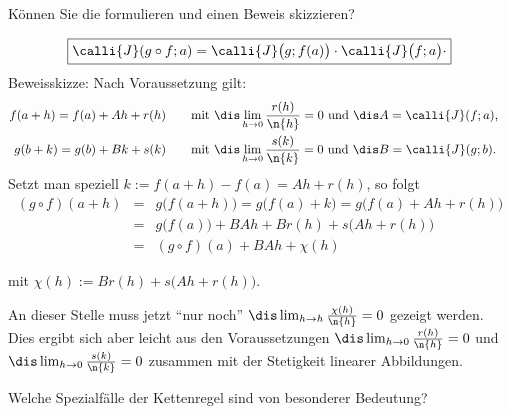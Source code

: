 \begin{frage}
  Können Sie die  formulieren und einen Beweis skizzieren?
\end{frage}

\begin{antwort}
  \[
  \boxed{ 
    \calli{J} ( g\circ f; a) = 
    \calli{J} \big(g;f(a)\big)\cdot
    \calli{J} \big(f;a\big)\cdot
  }
  \]
  \medskip\noindent
  Beweisskizze: Nach Voraussetzung gilt:
  \begin{align*}
    f(a+h)=f(a)+Ah + r(h) &
    \qquad\text{mit $\dis\lim_{h\to 0} \frac{r(h)}{\n{h}}=0$ 
      und $\dis A= \calli{J}(f;a)$,}& \\
    g(b+k)=g(b)+Bk + s(k) &\qquad\text{mit 
      $\dis\lim_{h\to 0} \frac{s(k)}{\n{k}}=0$ 
      und $\dis B= \calli{J}(g;b)$.}&
  \end{align*}
  Setzt man speziell $k := f(a+h)-f(a)=Ah+r(h)$, so folgt 
  \begin{eqnarray*}
    (g\circ f)(a+h) &=& g \big( f(a+h) \big) = g \big( f(a)+k \big) 
    = g \big( f(a)+ Ah + r(h) \big)
    \\
    &=& g \big( f(a) \big) + BAh + Br(h) + s\big( Ah + r(h) \big) \\
    &=& (g\circ f) (a) + BAh + \chi( h ) 
  \end{eqnarray*}

  \medskip\noindent
  mit $\chi(h) := Br(h)+ s \big(Ah+r(h) \big)$. 

  An dieser Stelle muss jetzt "`nur noch"' 
  $ \dis \lim_{h\to h} \frac{\chi(h)}{ \n{h} }=0$ gezeigt werden. 
  Dies ergibt sich 
  aber leicht aus den Voraussetzungen 
  $ \dis \lim_{h\to 0} \frac{r(h)}{ \n{h} } =0$ und 
  $ \dis \lim_{h\to 0} \frac{s(k)}{ \n{k} } =0$ zusammen mit der Stetigkeit 
  linearer Abbildungen.\AntEnd
\end{antwort}


\begin{frage}\label{10_kettspez}
  Welche Spezialfälle der Kettenregel sind von besonderer Bedeutung?
\end{frage}


